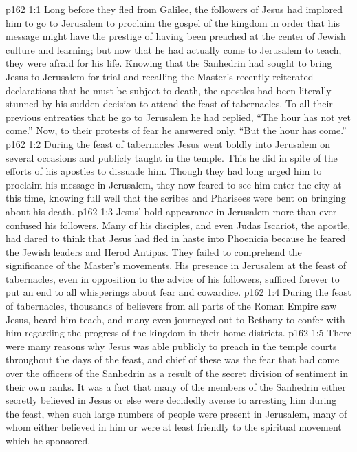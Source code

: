 \vs p162 1:1 Long before they fled from Galilee, the followers of Jesus had implored him to go to Jerusalem to proclaim the gospel of the kingdom in order that his message might have the prestige of having been preached at the center of Jewish culture and learning; but now that he had actually come to Jerusalem to teach, they were afraid for his life. Knowing that the Sanhedrin had sought to bring Jesus to Jerusalem for trial and recalling the Master’s recently reiterated declarations that he must be subject to death, the apostles had been literally stunned by his sudden decision to attend the feast of tabernacles. To all their previous entreaties that he go to Jerusalem he had replied, \textcolor{ubdarkred}{“The hour has not yet come.”} Now, to their protests of fear he answered only, \textcolor{ubdarkred}{“But the hour has come.”}
\vs p162 1:2 During the feast of tabernacles Jesus went boldly into Jerusalem on several occasions and publicly taught in the temple. This he did in spite of the efforts of his apostles to dissuade him. Though they had long urged him to proclaim his message in Jerusalem, they now feared to see him enter the city at this time, knowing full well that the scribes and Pharisees were bent on bringing about his death.
\vs p162 1:3 Jesus’ bold appearance in Jerusalem more than ever confused his followers. Many of his disciples, and even Judas Iscariot, the apostle, had dared to think that Jesus had fled in haste into Phoenicia because he feared the Jewish leaders and Herod Antipas. They failed to comprehend the significance of the Master’s movements. His presence in Jerusalem at the feast of tabernacles, even in opposition to the advice of his followers, sufficed forever to put an end to all whisperings about fear and cowardice.
\vs p162 1:4 During the feast of tabernacles, thousands of believers from all parts of the Roman Empire saw Jesus, heard him teach, and many even journeyed out to Bethany to confer with him regarding the progress of the kingdom in their home districts.
\vs p162 1:5 There were many reasons why Jesus was able publicly to preach in the temple courts throughout the days of the feast, and chief of these was the fear that had come over the officers of the Sanhedrin as a result of the secret division of sentiment in their own ranks. It was a fact that many of the members of the Sanhedrin either secretly believed in Jesus or else were decidedly averse to arresting him during the feast, when such large numbers of people were present in Jerusalem, many of whom either believed in him or were at least friendly to the spiritual movement which he sponsored.
